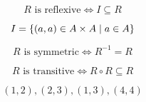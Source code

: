 \begin{frame}
  \begin{theorem}
    \[
      R \text{ is reflexive} \iff I \subseteq R
    \]
  \end{theorem}
  \[
    I = \{(a, a) \in A \times A \mid a \in A\}
  \]

  \pause
  \begin{theorem}
    \[
      R \text{ is symmetric} \iff R^{-1} = R
    \]
  \end{theorem}

  \pause
  \vspace{0.30cm}
  \begin{theorem}
    \[
      R \text{ is transitive} \iff R \circ R \subseteq R
    \]
  \end{theorem}

  \pause
  \[
    (1, 2), (2, 3), (1, 3), (4, 4)
  \]

\end{frame}
